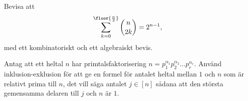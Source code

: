 \documentclass[nobib]{tufte-handout}
\begin{document}
\begin{xca}
    Bevisa att
    $$\sum_{k = 0}^{\floor{\frac{n}{2}}} \binom{n}{2k} = 2^{n-1},$$
    med ett kombinatoriskt och ett algebraiskt bevis.
\end{xca}

\begin{xca}
    Antag att ett heltal $n$ har primtalsfaktorisering $n = p_1^{\alpha_1}p_2^{\alpha_2}\ldots p_r^{\alpha_r}$. Använd inklusion-exklusion för att ge en formel för antalet heltal mellan $1$ och $n$ som är relativt prima till $n$, det vill säga antalet $j \in [n]$ sådana att den största gemensamma delaren till $j$ och $n$ är $1$.
\end{xca}

%
%
\end{document}
